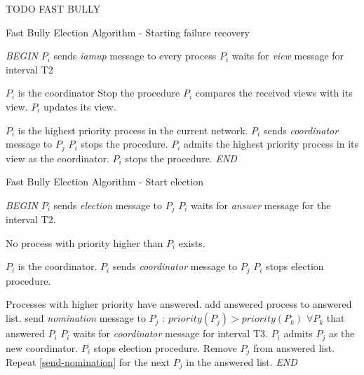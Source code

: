 \documentclass[dareport.tex]{subfiles}
\begin{document}
TODO FAST BULLY
\begin{algorithm}[h]
	\caption{Fast Bully Election Algorithm - Starting failure recovery}
	\label{fast-bully-algorithm-start-failure-recovery}
	\begin{algorithmic}[1]
		\BState \emph{BEGIN}
		\State $P_{i}$ sends \emph{iamup} message to every process
		\State $P_{i}$ waits for \emph{view} message for interval T2
		
		\Comment $P_{i}$ is the coordinator
		\State Stop the procedure
		\Else
		\State $P_{i}$ compares the received views with its view.
			\State $P_{i}$ updates its view.
		\EndIf
		
		\Comment $P_{i}$ is the highest priority process in the current network.
				\State $P_{i}$ sends \emph{coordinator} message to $P_{j}$
				\State $P_{i}$ stops the procedure.
			\EndFor
		\Else
			\State $P_{i}$ admits the highest priority process in its view as the coordinator.
			\State $P_{i}$ stops the procedure.
		\EndIf
		\EndIf
		\EndProcedure
		\BState \emph{END}
	\end{algorithmic}
\end{algorithm}
\begin{algorithm}[h]
	\caption{Fast Bully Election Algorithm -  Start election}
	\label{fast-bully-algorithm-start-election}
	\begin{algorithmic}[1]
		\BState \emph{BEGIN}
				\State $P_{i}$ sends \emph{election} message to $P_{j}$
			\EndFor
			\State $P_{i}$ waits for \emph{answer} message for the interval T2.
				
			\Comment No process with priority higher than $P_{i}$ exists.
				
			\Comment $P_{i}$ is the coordinator.
					\State $P_{i}$ sends \emph{coordinator} message to $P_{j}$
				\EndFor
				\State $P_{i}$ stops election procedure.
			\Else
			
			\Comment Processes with higher priority have answered.
				\State add answered process to answered list.
				\State send \emph{nomination} message to $P_{j}$ : $priority(P_{j}) > priority(P_{k})$ $\forall P_{k}$ that answered  $P_{i}$ \label{send-nomination}
				\State $P_{i}$ waits for \emph{coordinator} message for interval T3.
					\State $P_{i}$ admits $P_{j}$ as the new coordinator.
					\State $P_{i}$ stops election procedure.
				\Else
					\State Remove $P_{j}$ from answered list.
					\State Repeat \cref{send-nomination} for the next $P_{j}$ in the answered list.
						\State {}
					\EndIf
				\EndIf
			\EndIf
		\EndProcedure
		\BState \emph{END}
	\end{algorithmic}
\end{algorithm}
\end{document}
